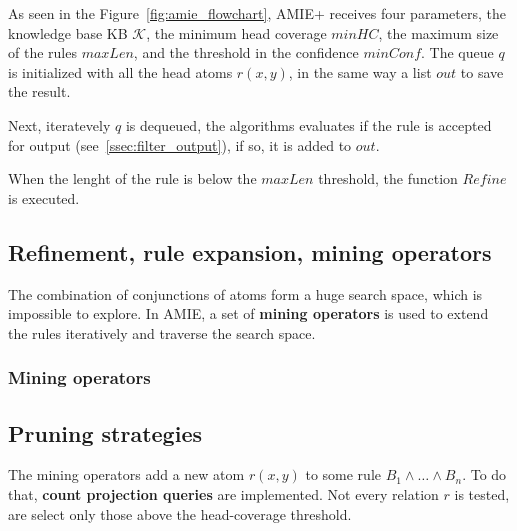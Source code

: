 \documentclass{article}
\begin{document}
As seen in the Figure~\ref{fig:amie_flowchart}, AMIE+ receives four parameters,
the knowledge base KB $\mathcal{K}$, the minimum head coverage $minHC$, the
maximum size of the rules $maxLen$, and the threshold in the confidence
$minConf$. The queue $q$ is initialized  with all the head atoms $r(x,y)$, in
the same way a list $out$ to save the result.

Next, iteratevely $q$ is dequeued, the algorithms evaluates if the
rule is accepted for output (see~\ref{ssec:filter_output}), if so, it is added
to $out$.

When the lenght of the rule is below the $maxLen$ threshold, the function $Refine$
is executed.


\subsection{Refinement, rule expansion, mining operators}


The combination of conjunctions of atoms form a huge search space, which is
impossible to explore. In AMIE, a set of \textbf{mining operators} is used to
extend the rules iteratively and traverse the search space.

\subsubsection{Mining operators}
\subsection{Pruning strategies}

The mining operators add a new atom $r(x, y)$ to some rule $B_1 \land \ldots
\land B_n$. To do that, \textbf{count projection queries} are implemented. Not
every relation $r$ is tested, are select only those above the head-coverage threshold.
\end{document}
